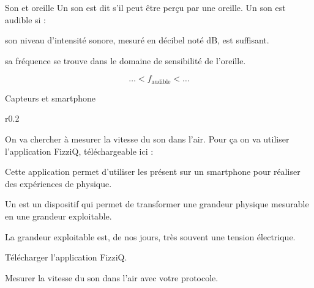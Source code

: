 \begin{doc}{Son et oreille}
  Un son est dit  s'il peut être perçu par une oreille.
  Un son est audible si :
  \begin{listePoints}
    \item son niveau d'intensité sonore, mesuré en décibel noté dB, est suffisant.
    \item sa fréquence se trouve dans le domaine de sensibilité de l'oreille.
  \end{listePoints}
  \begin{equation*}
      \ldots < f_\text{audible} < \ldots
  \end{equation*}
\end{doc}



\begin{doc}{Capteurs et smartphone}
  \vspace*{-18pt}
  \begin{wrapfigure}[5]{r}{0.2\linewidth}
    \vspace*{-24pt}
  \end{wrapfigure}
  On va chercher à mesurer la vitesse du son dans l'air.
  Pour ça on va utiliser l'application FizziQ, téléchargeable ici :
  
  Cette application permet d'utiliser les  présent sur un smartphone pour réaliser des expériences de physique.
  
  \begin{encart}
    Un  est un dispositif qui permet de transformer une grandeur physique mesurable en une grandeur exploitable.
  \end{encart}
  La grandeur exploitable est, de nos jours, très souvent une tension électrique.
\end{doc}


\numeroQuestion Télécharger l'application FizziQ.


\mesure Mesurer la vitesse du son dans l'air avec votre protocole.